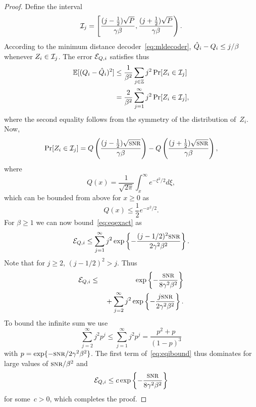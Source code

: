 \begin{proof}
  Define the interval
  \begin{equation*}
    \mathcal{I}_j = \left[ \frac{(j - \frac12) \sqrt{P}}{\gamma\beta},
    \frac{(j + \frac12) \sqrt{P}}{\gamma\beta } \right).
  \end{equation*}
  According to the minimum distance decoder~\eqref{eq:mldecoder}, $\hat{Q}_i - Q_i
  \le j/\beta$ whenever $Z_i \in \mathcal{I}_j$.  The error ${{\mathcal{E}}_{Q,i}}$ satisfies thus
  \begin{align}
    \mathbb{E}[(Q_i - \hat{Q}_i)^2] &\le \frac{1}{\beta^2} \sum_{j \in \mathbb{Z}} j^2 \Pr[Z_i \in
    \mathcal{I}_j]  \nonumber \\
    &= \frac{2}{\beta^2} \sum_{j = 1}^\infty j^2 \Pr[Z_i \in \mathcal{I}_j],
    \label{eq:eqexact}
  \end{align}
  where the second equality follows from the symmetry of the distribution
  of~$Z_i$. Now,
  \begin{equation*}
    \Pr[Z_i \in \I_j] = Q\left( \frac{(j - \frac12) \sqrt \snr}{\gamma\beta}
    \right) - Q\left( \frac{(j + \frac12) \sqrt{\snr}}{\gamma\beta } \right),
  \end{equation*}
  where
  \begin{equation*}
    Q(x) = \frac{1}{\sqrt{2\pi}} \int_x^\infty e^{-\xi^2/2} d\xi,
  \end{equation*}
  which can be bounded from above for $x \ge 0$ as
  \begin{equation*}
    Q(x) \le \frac12 e^{-x^2/2}.
  \end{equation*}
  For $\beta \ge 1$ we can now bound~\eqref{eq:eqexact} as
  \begin{equation*}
    \Eqi \le \sum_{j=1}^\infty j^2 \exp\left\{ - \frac{(j - 1/2)^2
    \snr}{2\gamma^2\beta^2} \right\}.
  \end{equation*}
  Note that for $j \ge 2$, $(j - 1/2)^2 > j$.  Thus
  \begin{eqnarray}
    \Eqi &\le & \exp \left \{ - \frac{\snr}{8 \gamma^2 \beta^2} \right\}
    \nonumber \\
    & & \mbox{} + 
    \sum_{j = 2}^\infty j^2 \exp \left \{ - \frac{j \snr}{2\gamma^2 \beta^2}
    \right\}. \label{eq:eqibound}
  \end{eqnarray}
  To bound the infinite sum we use 
  \begin{equation}
    \label{eq:geomsum}
    \sum_{j=2}^\infty j^2 p^j \le \sum_{j=1}^\infty j^2 p^j = 
    \frac{p^2+p}{(1-p)^3}
  \end{equation}
  with $p = \exp\{-\snr/2 \gamma^2 \beta^2\}$. The first term
  of~\eqref{eq:eqibound} thus dominates for large values of
  $\snr/\beta^2$ and
  \begin{equation*}
    \Eqi \le c\exp\left\{ - \frac{\snr}{8 \gamma^2 \beta^2} \right\}
  \end{equation*}
  for some~$c > 0$, which completes the proof. 
\end{proof}

